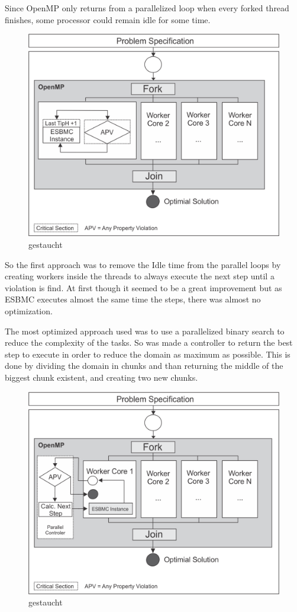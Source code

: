 Since OpenMP only returns from a parallelized loop when every forked thread finishes, some processor could remain idle for some time.
\begin{figure}[ht]
	\centering
  \includegraphics[scale=0.75]{Image/esbmc-parallel.png} 
	\caption{gestaucht}
	\label{fig2}
\end{figure}
So the first approach was to remove the Idle time from the parallel loops by creating workers inside the threads to always execute the next step until a violation is find. At first though it seemed to be a great improvement but as ESBMC executes almost the same time the steps, there was almost no optimization. 

The most optimized approach used was to use a parallelized binary search to reduce the complexity of the tasks. So was made a controller to return the best step to execute in order to reduce the domain as maximum as possible. This is done by dividing the domain in chunks and than returning the middle of the biggest chunk existent, and creating two new chunks.
\begin{figure}[ht]
	\centering
  \includegraphics[scale=0.75]{Image/esbmc-parallel-Controler.png} 
	\caption{gestaucht}
	\label{fig2}
\end{figure}

